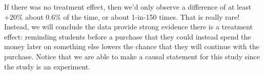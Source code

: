 If there was no treatment effect, then we'd only observe a difference of at least +20\% about 0.6\% of the time, or about 1-in-150 times. That is really rare! Instead, we will conclude the data provide strong evidence there is a treatment effect: reminding students before a purchase that they could instead spend the money later on something else lowers the chance that they will continue with the purchase. Notice that we are able to make a causal statement for this study since the study is an experiment.

\textPE{\newpage}










%
%
%
%





